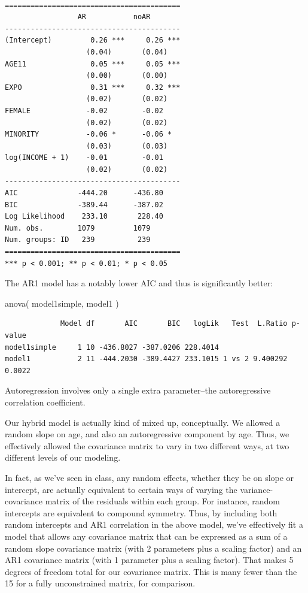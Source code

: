 \documentclass[
  letterpaper,
  DIV=11,
  numbers=noendperiod]{scrreprt}
\newenvironment{Shaded}{}{}
\newcommand{\FunctionTok}[1]{\textcolor[rgb]{0.02,0.16,0.49}{#1}}
\newcommand{\NormalTok}[1]{#1}
\begin{document}
\begin{verbatim}

=========================================
                 AR           noAR       
-----------------------------------------
(Intercept)         0.26 ***     0.26 ***
                   (0.04)       (0.04)   
AGE11               0.05 ***     0.05 ***
                   (0.00)       (0.00)   
EXPO                0.31 ***     0.32 ***
                   (0.02)       (0.02)   
FEMALE             -0.02        -0.02    
                   (0.02)       (0.02)   
MINORITY           -0.06 *      -0.06 *  
                   (0.03)       (0.03)   
log(INCOME + 1)    -0.01        -0.01    
                   (0.02)       (0.02)   
-----------------------------------------
AIC              -444.20      -436.80    
BIC              -389.44      -387.02    
Log Likelihood    233.10       228.40    
Num. obs.        1079         1079       
Num. groups: ID   239          239       
=========================================
*** p < 0.001; ** p < 0.01; * p < 0.05
\end{verbatim}

The AR1 model has a notably lower AIC and thus is significantly better:

\begin{Shaded}
\begin{Highlighting}[]
\FunctionTok{anova}\NormalTok{( model1simple, model1 )}
\end{Highlighting}
\end{Shaded}

\begin{verbatim}
             Model df       AIC       BIC   logLik   Test  L.Ratio p-value
model1simple     1 10 -436.8027 -387.0206 228.4014                        
model1           2 11 -444.2030 -389.4427 233.1015 1 vs 2 9.400292  0.0022
\end{verbatim}

Autoregression involves only a single extra parameter--the
autoregressive correlation coefficient.

Our hybrid model is actually kind of mixed up, conceptually. We allowed
a random slope on age, and also an autoregressive component by age.
Thus, we effectively allowed the covariance matrix to vary in two
different ways, at two different levels of our modeling.

In fact, as we've seen in class, any random effects, whether they be on
slope or intercept, are actually equivalent to certain ways of varying
the variance-covariance matrix of the residuals within each group. For
instance, random intercepts are equivalent to compound symmetry. Thus,
by including both random intercepts and AR1 correlation in the above
model, we've effectively fit a model that allows any covariance matrix
that can be expressed as a sum of a random slope covariance matrix (with
2 parameters plus a scaling factor) and an AR1 covariance matrix (with 1
parameter plus a scaling factor). That makes 5 degrees of freedom total
for our covariance matrix. This is many fewer than the 15 for a fully
unconstrained matrix, for comparison.
\end{document}

